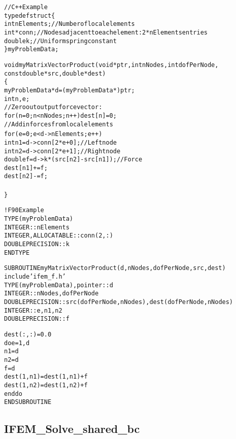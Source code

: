 \documentclass[10pt]{article}
\begin{document}
\begin{alltt}
// C++ Example
typedef struct \{
  int nElements; //Number of local elements
  int *conn; // Nodes adjacent to each element: 2*nElements entries
  double k; //Uniform spring constant
\} myProblemData;

void myMatrixVectorProduct(void *ptr,int nNodes,int dofPerNode,
          const double *src,double *dest) 
\{
  myProblemData *d=(myProblemData *)ptr;
  int n,e;
  // Zero out output force vector:
  for (n=0;n<nNodes;n++) dest[n]=0;
  // Add in forces from local elements
  for (e=0;e<d->nElements;e++) {
    int n1=d->conn[2*e+0]; // Left node
    int n2=d->conn[2*e+1]; // Right node
    double f=d->k * (src[n2]-src[n1]); //Force
    dest[n1]+=f;
    dest[n2]-=f;
  }
\}


! F90 Example
  TYPE(myProblemData) 
    INTEGER :: nElements
    INTEGER, ALLOCATABLE :: conn(2,:)
    DOUBLE PRECISION :: k
  END TYPE
  
SUBROUTINE myMatrixVectorProduct(d,nNodes,dofPerNode,src,dest)
  include 'ifem\_f.h'
  TYPE(myProblemData), pointer :: d
  INTEGER :: nNodes,dofPerNode
  DOUBLE PRECISION :: src(dofPerNode,nNodes), dest(dofPerNode,nNodes)
  INTEGER :: e,n1,n2
  DOUBLE PRECISION :: f
  
  dest(:,:)=0.0
  do e=1,d%nElements
    n1=d%conn(1,e)
    n2=d%conn(2,e)
    f=d%k * (src(1,n2)-src(1,n1))
    dest(1,n1)=dest(1,n1)+f
    dest(1,n2)=dest(1,n2)+f
  end do
END SUBROUTINE
\end{alltt}


\newpage
\subsection{IFEM\_Solve\_shared\_bc}

\end{document}
